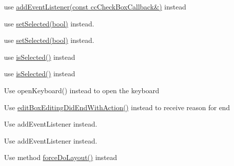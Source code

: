 \begin{DoxyRefList}
use {\ttfamily \hyperlink{classui_1_1CheckBox_a11c1b9cd5d7314a980f994977f960822}{add\+Event\+Listener(const cc\+Check\+Box\+Callback\&)}} instead  
\item[\label{deprecated__deprecated000140}%
\Hypertarget{deprecated__deprecated000140}%
Member \hyperlink{classui_1_1CheckBox_ab406d6690121119d07b014c634bf894c}{ui\+:\+:Check\+Box\+:\+:get\+Selected\+State} () const]use {\ttfamily \hyperlink{classui_1_1AbstractCheckButton_aca6eea451771dd184a1cd02984e77cc6}{set\+Selected(bool)}} instead. 

use {\ttfamily \hyperlink{classui_1_1AbstractCheckButton_aca6eea451771dd184a1cd02984e77cc6}{set\+Selected(bool)}} instead.  
\item[\label{deprecated__deprecated000139}%
\Hypertarget{deprecated__deprecated000139}%
Member \hyperlink{classui_1_1CheckBox_a44e1b53dcbc7ac25e41b72e2e4487775}{ui\+:\+:Check\+Box\+:\+:set\+Selected\+State} (bool selected)]use {\ttfamily \hyperlink{classui_1_1AbstractCheckButton_ade8bb264515600c46a81947344f4a53b}{is\+Selected()}} instead 

use {\ttfamily \hyperlink{classui_1_1AbstractCheckButton_ade8bb264515600c46a81947344f4a53b}{is\+Selected()}} instead  
\item[\label{deprecated__deprecated000376}%
\Hypertarget{deprecated__deprecated000376}%
Member \hyperlink{classui_1_1EditBox_a74da824c15ca8e40a5e70d39bc036a8a}{ui\+:\+:Edit\+Box\+:\+:touch\+Down\+Action} (\hyperlink{classRef}{Ref} $\ast$sender, Touch\+Event\+Type control\+Event)]Use open\+Keyboard() instead to open the keyboard  
\item[\label{deprecated__deprecated000375}%
\Hypertarget{deprecated__deprecated000375}%
Member \hyperlink{classui_1_1EditBoxDelegate_a0703fe7737a945f4791c53be7dcffa1e}{ui\+:\+:Edit\+Box\+Delegate\+:\+:edit\+Box\+Editing\+Did\+End} (\hyperlink{classui_1_1EditBox}{Edit\+Box} $\ast$)]Use \hyperlink{classui_1_1EditBoxDelegate_a61ed8e1dccf66b4734f36e18e3bb14be}{edit\+Box\+Editing\+Did\+End\+With\+Action()} instead to receive reason for end  
\item[\label{deprecated__deprecated000145}%
\Hypertarget{deprecated__deprecated000145}%
Member \hyperlink{classui_1_1ListView_a556eebb13ecb5dd706023857477c4b46}{ui\+:\+:List\+View\+:\+:add\+Event\+Listener\+List\+View} (\hyperlink{classRef}{Ref} $\ast$target, S\+E\+L\+\_\+\+List\+View\+Event selector)]Use {\ttfamily add\+Event\+Listener} instead. 

Use {\ttfamily add\+Event\+Listener} instead.  
\item[\label{deprecated__deprecated000147}%
\Hypertarget{deprecated__deprecated000147}%
Member \hyperlink{classui_1_1ListView_a67165072bad734eacc1cd3607471f024}{ui\+:\+:List\+View\+:\+:refresh\+View} ()]Use method \hyperlink{classui_1_1Layout_a280952253418e0951ecdff43172a3c68}{force\+Do\+Layout()} instead 


\end{DoxyRefList}
